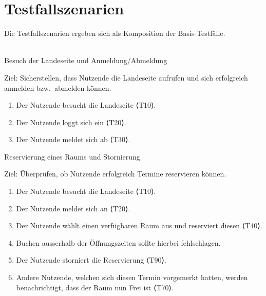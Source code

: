\section{Testfallszenarien}
Die Testfallszenarien ergeben sich als Komposition der Basis-Testfälle.\\ \\
\begin{scenario}{10}{Besuch der Landeseite und Anmeldung/Abmeldung}
  \item[Ziel:] Sicherstellen, dass Nutzende die Landeseite aufrufen und sich erfolgreich anmelden bzw.\ abmelden können.
  \begin{enumerate}
    \item Der Nutzende besucht die Landeseite ⟨T10⟩.
    \item Der Nutzende loggt sich ein ⟨T20⟩.
    \item Der Nutzende meldet sich ab ⟨T30⟩.
  \end{enumerate}
\end{scenario}

\begin{scenario}{20}{Reservierung eines Raums und Stornierung}
  \item[Ziel:] Überprüfen, ob Nutzende erfolgreich Termine reservieren können.
  \begin{enumerate}
    \item Der Nutzende besucht die Landeseite ⟨T10⟩.
    \item Der Nutzende meldet sich an ⟨T20⟩.
    \item Der Nutzende wählt einen verfügbaren Raum aus und reserviert diesen ⟨T40⟩.
    \item Buchen ausserhalb der Öffnungszeiten sollte hierbei fehlschlagen.
    \item Der Nutzende storniert die Reservierung ⟨T90⟩.
    \item Andere Nutzende, welchen sich diesen Termin vorgemerkt hatten, werden benachrichtigt, dass der Raum nun Frei ist ⟨T70⟩.
  \end{enumerate}
\end{scenario}

